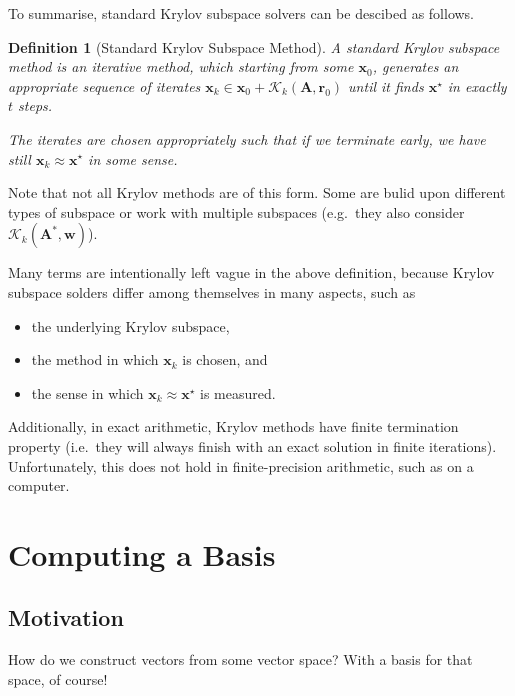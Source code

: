 \documentclass[12pt,a4paper]{article} %
\newtheorem*{definition}{Definition}
\begin{document}
To summarise, standard Krylov subspace solvers can be descibed as follows.
\begin{definition}[Standard Krylov Subspace Method]
    A standard Krylov subspace method is an {iterative method}, 
    which starting from some $\bm x_0$, 
    generates an appropriate sequence of iterates 
    $\bm x_k \in \bm x_0 + \mathcal K_k (\mathbf A, \bm r_0)$
    until it finds $\bm x^\star$ in exactly $t$ steps.

    The iterates are chosen appropriately such that if we terminate
    early, we have still $\bm x_k \approx \bm x^\star$ in some sense.
\end{definition}
Note that not all Krylov methods are of this form. Some are bulid upon 
different types of subspace or work with multiple subspaces (e.g.\ they 
also consider $\mathcal K_k (\mathbf A^*, \bm w)$).

Many terms are intentionally left vague in the above definition, because 
Krylov subspace solders differ among themselves in many aspects, such as 
\begin{itemize}
    \item the underlying Krylov subspace, 
    \item the method in which $\bm x_k$ is chosen, and
    \item the sense in which $\bm x_k \approx \bm x^\star$ is measured.
\end{itemize}
Additionally, in exact arithmetic, Krylov methods have finite termination property 
(i.e.\ they will always finish with an exact solution in finite iterations). 
Unfortunately, this does not hold in finite-precision
 arithmetic, such as on a computer.

\section{Computing a Basis}
\subsection{Motivation}
How do we construct vectors from some vector space? With a basis for that 
space, of course!
\end{document}
